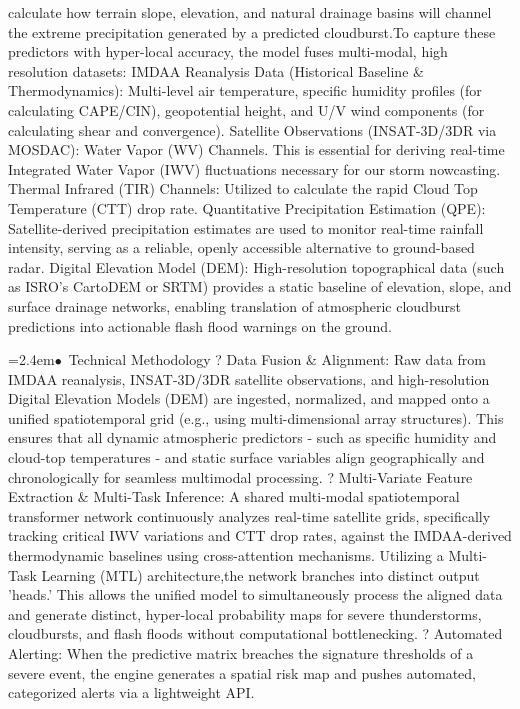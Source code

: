 \documentclass[10pt,a4paper]{article}
\begin{document}
\begin{tcolorbox}[pscard, title={"\textbf{SIH26077} \quad $\vert$ \quad AI-Driven Hyper-Local Early Warning System for Severe Weather Nowcasting}]
calculate how terrain slope, elevation, and natural drainage basins will channel the extreme precipitation generated by a predicted cloudburst.To capture these predictors with hyper-local accuracy, the model fuses multi-modal, high resolution datasets: IMDAA Reanalysis Data (Historical Baseline \& Thermodynamics): Multi-level air temperature, specific humidity profiles (for calculating CAPE/CIN), geopotential height, and U/V wind components (for calculating shear and convergence). Satellite Observations (INSAT-3D/3DR via MOSDAC): Water Vapor (WV) Channels. This is essential for deriving real-time Integrated Water Vapor (IWV) fluctuations necessary for our storm nowcasting. Thermal Infrared (TIR) Channels: Utilized to calculate the rapid Cloud Top Temperature (CTT) drop rate. Quantitative Precipitation Estimation (QPE): Satellite-derived precipitation estimates are used to monitor real-time rainfall intensity, serving as a reliable, openly accessible alternative to ground-based radar. Digital Elevation Model (DEM): High-resolution topographical data (such as ISRO's CartoDEM or SRTM) provides a static baseline of elevation, slope, and surface drainage networks, enabling translation of atmospheric cloudburst predictions into actionable flash flood warnings on the ground.\par\vspace{0.05cm}
\noindent\hspace*{1.2em}\hangindent=2.4em\textcolor{sihblue}{$\bullet$}~\small Technical Methodology ? Data Fusion \& Alignment: Raw data from IMDAA reanalysis, INSAT-3D/3DR satellite observations, and high-resolution Digital Elevation Models (DEM) are ingested, normalized, and mapped onto a unified spatiotemporal grid (e.g., using multi-dimensional array structures). This ensures that all dynamic atmospheric predictors - such as specific humidity and cloud-top temperatures - and static surface variables align geographically and chronologically for seamless multimodal processing. ? Multi-Variate Feature Extraction \& Multi-Task Inference: A shared multi-modal spatiotemporal transformer network continuously analyzes real-time satellite grids, specifically tracking critical IWV variations and CTT drop rates, against the IMDAA-derived thermodynamic baselines using cross-attention mechanisms. Utilizing a Multi-Task Learning (MTL) architecture,the network branches into distinct output 'heads.' This allows the unified model to simultaneously process the aligned data and generate distinct, hyper-local probability maps for severe thunderstorms, cloudbursts, and flash floods without computational bottlenecking. ? Automated Alerting: When the predictive matrix breaches the signature thresholds of a severe event, the engine generates a spatial risk map and pushes automated, categorized alerts via a lightweight API.\par\vspace{0.05cm}

\end{tcolorbox}
\end{document}
